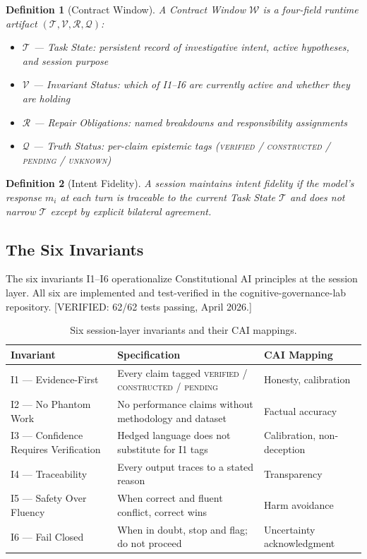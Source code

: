 \documentclass{article}
\newtheorem{definition}{Definition}
\newcommand{\cai}{Constitutional AI\xspace}
\newcommand{\verified}[1]{\textcolor{verifiedgreen}{[VERIFIED: #1]}}
\begin{document}
\begin{definition}[Contract Window]
A Contract Window $\mathcal{W}$ is a four-field runtime artifact
$(\mathcal{T}, \mathcal{V}, \mathcal{R}, \mathcal{Q})$:
\begin{itemize}
\item $\mathcal{T}$ --- Task State: persistent record of investigative intent,
active hypotheses, and session purpose
\item $\mathcal{V}$ --- Invariant Status: which of I1--I6 are currently active
and whether they are holding
\item $\mathcal{R}$ --- Repair Obligations: named breakdowns and responsibility
assignments
\item $\mathcal{Q}$ --- Truth Status: per-claim epistemic tags
(\textsc{verified} / \textsc{constructed} / \textsc{pending} /
\textsc{unknown})
\end{itemize}
\end{definition}

\begin{definition}[Intent Fidelity]
A session maintains intent fidelity if the model's response $m_i$ at each
turn is traceable to the current Task State $\mathcal{T}$ and does not narrow
$\mathcal{T}$ except by explicit bilateral agreement.
\end{definition}

\subsection{The Six Invariants}

The six invariants I1--I6 operationalize \cai{} principles at the session
layer. All six are implemented and test-verified in the
cognitive-governance-lab repository. \verified{62/62 tests passing, April 2026.}

\begin{table}[t]
\centering
\caption{Six session-layer invariants and their CAI mappings.}
\label{tab:invariants}
\begin{tabular}{lp{4.5cm}p{3.5cm}}
\toprule
\textbf{Invariant} & \textbf{Specification} & \textbf{CAI Mapping} \\
\midrule
I1 --- Evidence-First &
  Every claim tagged \textsc{verified} / \textsc{constructed} / \textsc{pending} &
  Honesty, calibration \\
I2 --- No Phantom Work &
  No performance claims without methodology and dataset &
  Factual accuracy \\
I3 --- Confidence Requires Verification &
  Hedged language does not substitute for I1 tags &
  Calibration, non-deception \\
I4 --- Traceability &
  Every output traces to a stated reason &
  Transparency \\
I5 --- Safety Over Fluency &
  When correct and fluent conflict, correct wins &
  Harm avoidance \\
I6 --- Fail Closed &
  When in doubt, stop and flag; do not proceed &
  Uncertainty acknowledgment \\
\bottomrule
\end{tabular}
\end{table}
\end{document}
